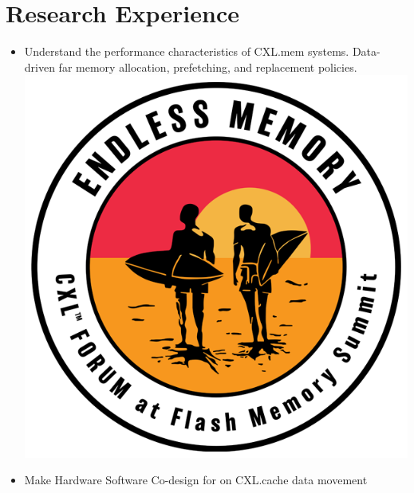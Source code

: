 \documentclass{resume}
\newcommand{\en}[1]{#1}
\newcommand{\zh}[1]{}
\begin{document}
\section{\en{Research Experience}\zh{研究经历}}

\en{}
\zh{\datedsubsection{\textbf{\href{https://www.ssrc.ucsc.edu/index.html}{加州大学圣克鲁兹分校存储中心}}}{08/2022 -- 现在}}
\en{}
\zh{\role{研究生科研}{助理}}
\begin{itemize}
      \item \small{ \en{Understand the performance characteristics of CXL.mem systems. Data-driven far memory allocation, prefetching, and replacement policies. } \zh{理解CXL.mem的性能分析。数据驱动的远端内存分配、预取和替换策略。}}\includegraphics[width=\linewidth/38]{cxl.png}
      \item \small{ \en{Make Hardware Software Co-design for on CXL.cache data movement}
}
\end{itemize}
\end{document}

